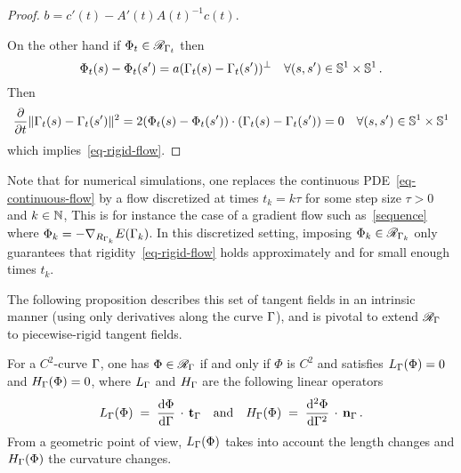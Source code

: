 \begin{proof}
$b=c'(t)- A'(t)A(t)^{-1}c(t)$.\par On the other hand if $\Phi_t \in \mathcal{R}_{\Gamma_t}$ then $$\Phi_t(s)-\Phi_t(s')=a(\Gamma_t(s)-\Gamma_t(s'))^\bot \quad \forall(s,s')\in \mathbb{S}^1\times\mathbb{S}^1\,.$$Then$$\frac{\partial}{\partial t}\| \Gamma_t(s)-\Gamma_t(s') \|^2=2(\Phi_t(s)-\Phi_t(s'))\cdot(\Gamma_t(s)-\Gamma_t(s'))=0 \quad \forall(s,s')\in \mathbb{S}^1\times\mathbb{S}^1$$which implies~\eqref{eq-rigid-flow}. 
\end{proof}

Note that for numerical simulations, one replaces the continuous PDE~\eqref{eq-continuous-flow} by a flow discretized at times $t_k = k \tau$ for some step size $\tau>0$ and $k \in \mathbb{N}$, 
This is for instance the case of a gradient flow such as~\eqref{sequence} where $\Phi_k = - \nabla_{R_{\Gamma_k}} E(\Gamma_k)$. In this discretized setting, imposing $\Phi_k \in \mathcal{R}_{\Gamma_k}$ only guarantees that rigidity~\eqref{eq-rigid-flow} holds approximately and for small enough times $t_k$. 

The following proposition describes this set of tangent fields in an intrinsic manner (using only derivatives along the curve $\Gamma$), and is pivotal to extend $\mathcal{R}_\Gamma$ to piecewise-rigid tangent fields.

\begin{prop}\label{charactrigid}
	For a $C^2$-curve $\Gamma$, one has $\Phi \in \mathcal{R}_\Gamma$ if and only if $\Phi$ is $C^2$ and satisfies $L_\Gamma(\Phi) = 0$ and $H_\Gamma(\Phi) = 0$, where $L_\Gamma$ and $H_\Gamma$ are the following linear operators
\begin{equation}\label{eqrigid}
 	L_\Gamma(\Phi) \;=\;   \frac{\mathrm{d}\Phi}{\mathrm{d}\Gamma}\, \cdot\, \mathbf{t}_\Gamma  
	\quad \text{and} \quad  
	H_\Gamma(\Phi) \;=\;  \frac{\mathrm{d}^2\Phi}{\mathrm{d}\Gamma^2} \, \cdot\, \mathbf{n}_\Gamma \,.
\end{equation}
From a geometric point of view, $L_\Gamma(\Phi)$ takes into account the length changes and $H_\Gamma(\Phi)$ the curvature changes.
\end{prop}

